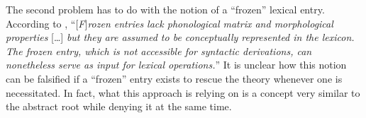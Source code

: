 The second problem has to do with the notion of a ``frozen'' lexical entry. According to \citet[116]{laks14}, ``[\emph{F}]\emph{rozen entries lack phonological matrix and morphological properties} [\dots] \emph{but they are assumed to be conceptually represented in the lexicon. The frozen entry, which is not accessible for syntactic derivations, can nonetheless serve as input for lexical operations.}'' It is unclear how this notion can be falsified if a ``frozen'' entry exists to rescue the theory whenever one is necessitated. In fact, what this approach is relying on is a concept very similar to the abstract root while denying it at the same time.

%

